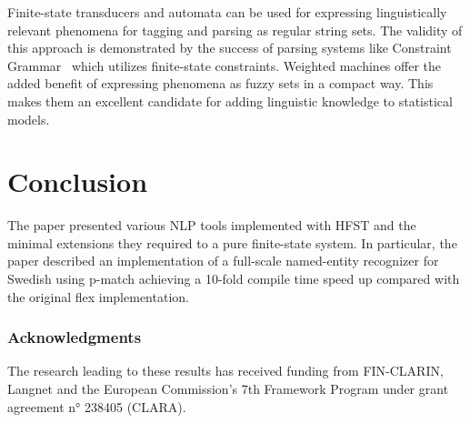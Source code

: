 \documentclass{llncs}
\begin{document}
Finite-state transducers and automata can be used for expressing
linguistically relevant phenomena for tagging and parsing as regular
string sets. The validity of this approach is demonstrated by the
success of parsing systems like Constraint
Grammar~\cite{karlsson/1990} which utilizes finite-state
constraints. Weighted machines offer the added benefit of expressing
phenomena as fuzzy sets in a compact way. This makes them an excellent
candidate for adding linguistic knowledge to statistical models.

\section{Conclusion}\label{hfst:conclusion}
The paper presented various NLP tools implemented with HFST and the minimal extensions they required to a pure finite-state system. In particular, the paper described an implementation of a full-scale named-entity recognizer for Swedish using p-match achieving a 10-fold compile time speed up compared with the original flex implementation.

\subsubsection*{Acknowledgments}
The research leading to these results has received funding from FIN-CLARIN, Langnet and the
European Commission's 7th Framework Program under grant agreement n° 238405 (CLARA).




\end{document}
